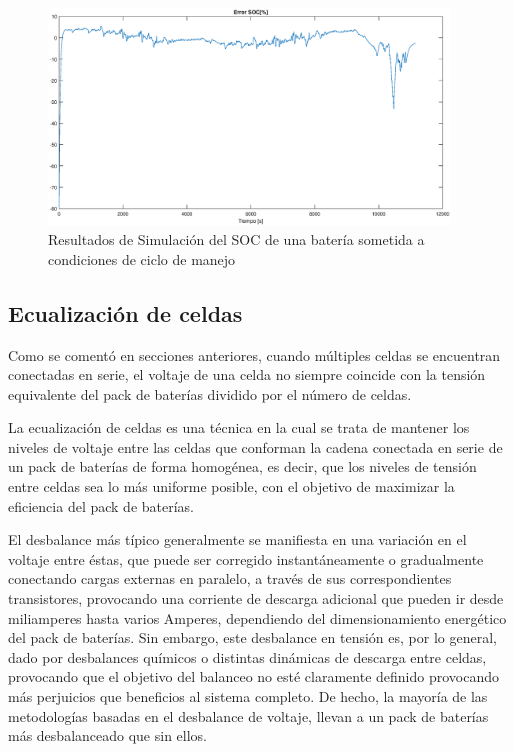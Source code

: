 \documentclass[10pt,a4paper]{article}
\begin{document}
	\begin{figure}[h!]
		\begin{center}
			\includegraphics[width=0.95\textwidth]{soc_error_porc.eps}
			\caption{Resultados de Simulación del SOC de una batería sometida a condiciones de ciclo de manejo}
			\label{error_SOC_Sim}
		\end{center}
	\end{figure}
	
	\subsection{Ecualización de celdas}
	
	\noindent Como se comentó en secciones anteriores, cuando múltiples celdas se encuentran conectadas en serie, el voltaje de una celda no siempre coincide con la tensión equivalente del pack de baterías dividido por el número de celdas. 
	
	\noindent La ecualización de celdas es una técnica en la cual se trata de mantener los niveles de voltaje entre las celdas que conforman la cadena conectada en serie de un pack de baterías de forma homogénea, es decir, que los niveles de tensión entre celdas sea lo más uniforme posible, con el objetivo de maximizar la eficiencia del pack de baterías.
	
	\noindent El desbalance más típico generalmente se manifiesta en una variación en el voltaje entre éstas, que puede ser corregido instantáneamente o gradualmente conectando cargas externas en paralelo, a través de sus correspondientes transistores, provocando una corriente de descarga adicional que pueden ir desde miliamperes hasta varios Amperes, dependiendo del dimensionamiento energético del pack de baterías. Sin embargo, este desbalance en tensión es, por lo general, dado por desbalances químicos o distintas dinámicas de descarga entre celdas, provocando que el objetivo del balanceo no esté claramente definido provocando más perjuicios que beneficios al sistema completo. De hecho, la mayoría de las metodologías basadas en el desbalance de voltaje, llevan a un pack de baterías más desbalanceado que sin ellos.
	
\end{document}
